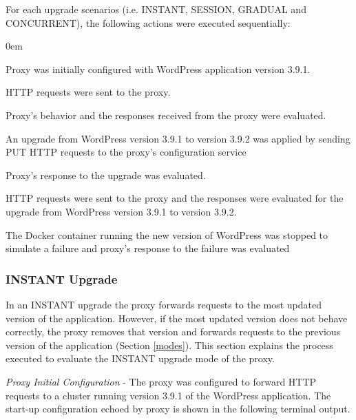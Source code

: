 \documentclass[a4paper,11pt,twoside]{report}
\begin{document}
For each upgrade scenarios (i.e. INSTANT, SESSION, GRADUAL and CONCURRENT), the following actions were executed sequentially:

\begin{list}{-}{}
  \itemsep0em
  \item Proxy was initially configured with WordPress application version 3.9.1. 
  \item HTTP requests were sent to the proxy.
  \item Proxy's behavior and the responses received from the proxy  were evaluated. 
  \item An upgrade from WordPress version 3.9.1 to version 3.9.2 was applied by sending PUT HTTP requests to the proxy's configuration service
  \item Proxy's response to the upgrade was evaluated.
  \item HTTP requests were sent to the proxy and the responses were evaluated for the upgrade from WordPress version 3.9.1 to version 3.9.2.
  \item The Docker container running the new version of WordPress was stopped to simulate a failure and proxy's response to the failure was evaluated   
\end{list} 

\subsubsection*{INSTANT Upgrade}
In an INSTANT upgrade the proxy  forwards requests to the most updated version of the application. However, if the most updated version does not behave correctly, the proxy removes that version and forwards requests to the previous version of the application (Section \ref{modes}). This section explains the process executed to evaluate the INSTANT upgrade mode of the proxy.\medskip

\noindent
\textit{Proxy Initial Configuration} - The proxy was configured to forward HTTP requests to a cluster running version 3.9.1 of the WordPress application. The start-up configuration echoed by proxy is shown in the following terminal output.\smallskip
\end{document}
